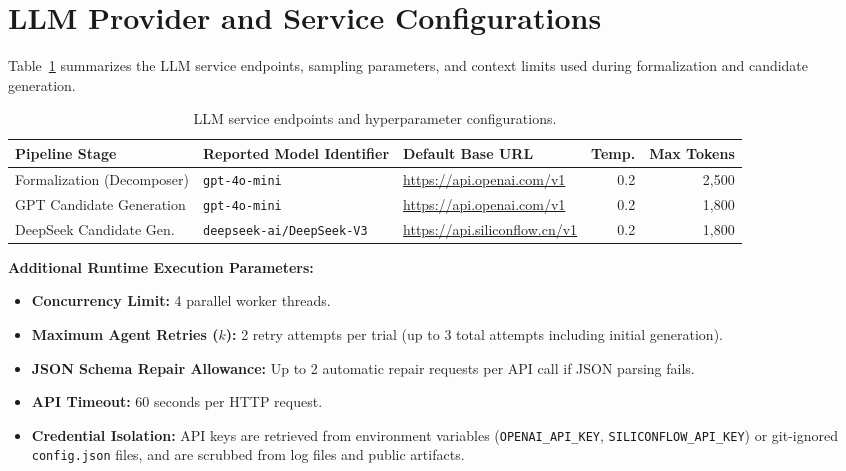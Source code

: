 \documentclass[11pt,letterpaper]{article}
\begin{document}
\section{LLM Provider and Service Configurations}\label{sec:service-configuration}

Table~\ref{tab:model-service-configuration} summarizes the LLM service endpoints, sampling parameters, and context limits used during formalization and candidate generation.

\begin{table}[htbp]
\centering
\small
\caption{LLM service endpoints and hyperparameter configurations.}
\label{tab:model-service-configuration}
\begin{tabular}{lllrr}
\toprule
Pipeline Stage & Reported Model Identifier & Default Base URL & Temp. & Max Tokens \\
\midrule
Formalization (Decomposer) & \texttt{gpt-4o-mini} & \url{https://api.openai.com/v1} & 0.2 & 2,500 \\
GPT Candidate Generation & \texttt{gpt-4o-mini} & \url{https://api.openai.com/v1} & 0.2 & 1,800 \\
DeepSeek Candidate Gen. & \texttt{deepseek-ai/DeepSeek-V3} & \url{https://api.siliconflow.cn/v1} & 0.2 & 1,800 \\
\bottomrule
\end{tabular}
\end{table}

\textbf{Additional Runtime Execution Parameters:}
\begin{itemize}
    \item \textbf{Concurrency Limit:} 4 parallel worker threads.
    \item \textbf{Maximum Agent Retries ($k$):} 2 retry attempts per trial (up to 3 total attempts including initial generation).
    \item \textbf{JSON Schema Repair Allowance:} Up to 2 automatic repair requests per API call if JSON parsing fails.
    \item \textbf{API Timeout:} 60 seconds per HTTP request.
    \item \textbf{Credential Isolation:} API keys are retrieved from environment variables (\texttt{OPENAI\_API\_KEY}, \texttt{SILICONFLOW\_API\_KEY}) or git-ignored \texttt{config.json} files, and are scrubbed from log files and public artifacts.
\end{itemize}

\end{document}
